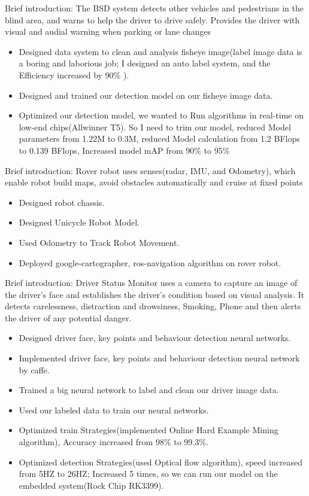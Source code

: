 \documentclass{resume}
\begin{document}
Brief introduction: The BSD system detects other vehicles and pedestrians in the blind area, and warns to help the driver to drive safely. Provides the driver with visual and audial warning when parking or lane changes

\begin{itemize}
  \item Designed data system to clean and analysis fisheye image(label image data is a boring and laborious job; I designed an auto label system, and the Efficiency increased by 90\% ).
  \item Designed and trained our detection model on our fisheye image data.
  \item Optimized our detection model, we wanted to Run algorithms in real-time on low-end chips(Allwinner T5). So I need to trim our model, reduced Model parameters from 1.22M to 0.3M, reduced Model calculation from 1.2 BFlops to 0.139 BFlops, Increased model mAP from 90\% to 95\%
\end{itemize}



Brief introduction: Rover robot uses senses(radar, IMU, and Odometry), which enable robot build maps, avoid obstacles automatically and cruise at fixed points

\begin{itemize}
  \item Designed robot chassis.
  \item Designed Unicycle Robot Model.
  \item Used Odometry to Track Robot Movement.
  \item Deployed google-cartographer, ros-navigation algorithm on rover robot.
\end{itemize}


Brief introduction: Driver Status Monitor uses a camera to capture an image of the driver’s face and establishes the driver’s condition based on visual analysis. It detects carelessness, distraction and drowsiness, Smoking, Phone and then alerts the driver of any potential danger.
\begin{itemize}
  \item Designed driver face, key points and behaviour detection neural networks.
  \item Implemented driver face, key points and behaviour detection neural network by caffe.
  \item Trained a big neural network to label and clean our driver image data.
  \item Used our labeled data to train our neural networks.
  \item Optimized train Strategies(implemented Online Hard Example Mining algorithm), Accuracy increased from 98\% to 99.3\%.
  \item Optimized detection Strategies(used Optical flow algorithm), speed increased from 5HZ to 26HZ; Increased 5 times, so we can run our model on the embedded system(Rock Chip RK3399).
\end{itemize}
\end{document}
